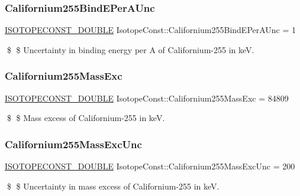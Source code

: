 \subsubsection{\texorpdfstring{Californium255\+Bind\+E\+Per\+A\+Unc}{Californium255BindEPerAUnc}}
{\footnotesize\ttfamily \mbox{\hyperlink{group___isotope_const-_macros_ga8f45a7272ce02c0b4c65c44636ed719a}{I\+S\+O\+T\+O\+P\+E\+C\+O\+N\+S\+T\+\_\+\+D\+O\+U\+B\+LE}} Isotope\+Const\+::\+Californium255\+Bind\+E\+Per\+A\+Unc = 1}

\$ \$ Uncertainty in binding energy per A of Californium-\/255 in keV. \mbox{\label{group___isotope_const-_californium-_cf255_gaffa2ba0a330db034aa795dbe5e343d52}} 
\subsubsection{\texorpdfstring{Californium255\+Mass\+Exc}{Californium255MassExc}}
{\footnotesize\ttfamily \mbox{\hyperlink{group___isotope_const-_macros_ga8f45a7272ce02c0b4c65c44636ed719a}{I\+S\+O\+T\+O\+P\+E\+C\+O\+N\+S\+T\+\_\+\+D\+O\+U\+B\+LE}} Isotope\+Const\+::\+Californium255\+Mass\+Exc = 84809}

\$ \$ Mass excess of Californium-\/255 in keV. \mbox{\label{group___isotope_const-_californium-_cf255_ga5dab667a1c87b2ca47329fd32fd6eb24}} 
\subsubsection{\texorpdfstring{Californium255\+Mass\+Exc\+Unc}{Californium255MassExcUnc}}
{\footnotesize\ttfamily \mbox{\hyperlink{group___isotope_const-_macros_ga8f45a7272ce02c0b4c65c44636ed719a}{I\+S\+O\+T\+O\+P\+E\+C\+O\+N\+S\+T\+\_\+\+D\+O\+U\+B\+LE}} Isotope\+Const\+::\+Californium255\+Mass\+Exc\+Unc = 200}

\$ \$ Uncertainty in mass excess of Californium-\/255 in keV. \mbox{\label{group___isotope_const-_californium-_cf255_gae2aa64a77143ae1439b4b62eb2ba4748}} 
